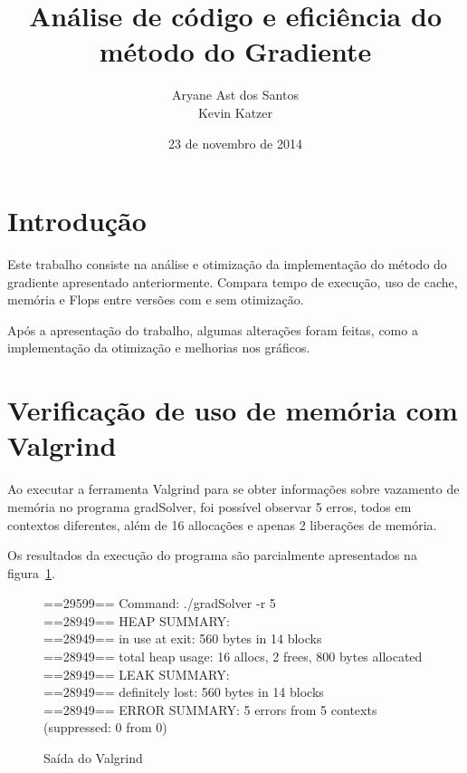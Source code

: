 \documentclass[12pt]{article}
\begin{document}
\setlength{\parskip}{0.2cm}

\title{Análise de código e eficiência do método do Gradiente}

\author{Aryane Ast dos Santos\\ Kevin Katzer}

\date{23 de novembro de 2014}

\maketitle

\tableofcontents

\pagebreak

\section{Introdução}

Este trabalho consiste na análise e otimização da implementação do método do
gradiente apresentado anteriormente. Compara tempo de execução, uso de cache,
memória e Flops entre versões com e sem otimização.

Após a apresentação do trabalho, algumas alterações foram feitas, como a 
implementação da otimização e melhorias nos gráficos.

\section{Verificação de uso de memória com Valgrind}\label{sec:Valgrind}

Ao executar a ferramenta Valgrind para se obter informações sobre vazamento de
memória no programa gradSolver, foi possível observar 5 erros, todos em
contextos diferentes, além de 16 allocações e apenas 2 liberações de memória.

Os resultados da execução do programa são parcialmente apresentados na
figura~\ref{fig:valgrindOut}.

\begin{figure}[htb]
\begin{tt}\noindent
==29599== Command: ./gradSolver -r 5\\
==28949== HEAP SUMMARY:\\
==28949==     in use at exit: 560 bytes in 14 blocks\\
==28949==   total heap usage: 16 allocs, 2 frees, 800 bytes allocated\\
==28949== LEAK SUMMARY:\\
==28949==    definitely lost: 560 bytes in 14 blocks\\
==28949== ERROR SUMMARY: 5 errors from 5 contexts (suppressed: 0 from 0)
\end{tt}\caption{Saída do Valgrind}\label{fig:valgrindOut}
\end{figure}
\end{document}
